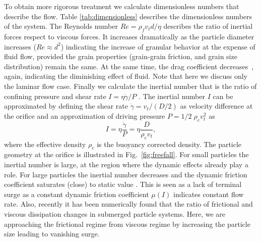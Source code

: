 \documentclass[twoside,twocolumn,9pt]{article}
\begin{document}
To obtain more rigorous treatment we calculate dimensionless numbers that describe the flow.
Table \ref{tab:dimensionless} describes the dimensionless numbers of the system.
The Reynolds number $Re = \rho_f v_t d/\eta$ describes the ratio of inertial forces respect to viscous forces. 
It increases dramatically as the particle diameter increases ($Re \approx d^2$) indicating
the increase of granular behavior at the expense of fluid flow, provided the grain properties (grain-grain friction, and grain size distribution) remain the same.
At the same time, the drag coefficient decreases~\cite{Morrison2013Drag}, again, indicating 
the diminishing effect of fluid. Note that here we discuss only the laminar flow case.
Finally we calculate the inertial number that is the ratio of confining 
pressure and shear rate $I=\eta \dot{\gamma}/P$ \cite{Houssais15NCO, Kamrin15SM}. 
The inertial number $I$ can be approximated by defining the shear rate 
$\dot{\gamma} = v_t/(D/2)$ as velocity difference at the orifice and an 
approximation of driving pressure $P = 1/2\;\rho_{e} v_t^2$
as
%
\begin{equation}
 I 	= \eta \frac{\dot{\gamma}}{P} = \eta \frac{D}{\rho_{e}v_t}, 
\end{equation}
%
\noindent where the effective density $\rho_{e}$ is the buoyancy 
corrected density. 
The particle geometry at the orifice is illustrated in Fig.~\ref{fig:freefall}.
For small particles the inertial number is large, at the region where the 
dynamic effects already play a role. For large particles 
the inertial number decreases and the dynamic friction coefficient 
saturates (close) to static value \cite{Singh15NJP}.
This is seen as a lack of terminal surge as a constant dynamic friction
coefficient $\mu(I)$ indicates constant flow rate. 
Also, recently \cite{Trulsson16PRE} it has been numerically found that the ratio of frictional and viscous dissipation changes in submerged particle systems. Here, we are approaching the frictional regime from viscous regime by increasing the particle size leading to vanishing surge. 
\end{document}
